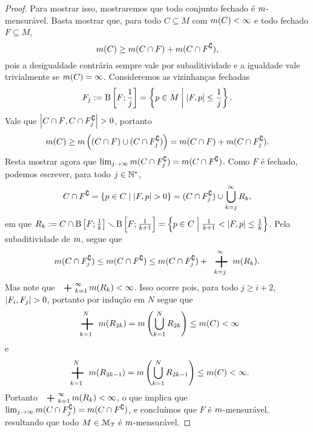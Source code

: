 \begin{proof}
Para mostrar isso, mostraremos que todo conjunto fechado é $m$-mensurável. Basta mostrar que, para todo $C \subseteq M$ com $m(C) < \infty$ e todo fechado $F \subseteq M$,
	\begin{equation*}
	m(C) \geq m(C \cap F) + m(C \cap F^\complement),
	\end{equation*}
pois a desigualdade contrária sempre vale por subaditividade e a igualdade vale trivialmente se $m(C) = \infty$. Consideremos as vizinhanças fechadas
	\begin{equation*}
	F_j := \mathrm{B}\left[{F};{\frac{1}{j}}\right] = \left\{{p \in M}\;\middle\vert\;{\left\vert{F},{p}\right\vert \leq \frac{1}{j}}\right\}.
	\end{equation*}
Vale que $\left\vert{C \cap F},{C \cap F_j^\complement}\right\vert > 0$, portanto
	\begin{equation*}
	m(C) \geq m\left( (C \cap F) \cup (C \cap F_j^\complement) \right) = m(C \cap F) + m(C \cap F_j^\complement).
	\end{equation*}
Resta mostrar agora que $\lim_{j \rightarrow \infty} m(C \cap F_j^\complement) = m(C \cap F^\complement)$. Como $F$ é fechado, podemos escrever, para todo $j \in \mathbb{N}^*$,
	\begin{equation*}
	C \cap F^\complement = \left\{{p \in C}\;\middle\vert\;{\left\vert{F},{p}\right\vert > 0}\right\} = (C \cap F_j^\complement) \cup \bigcup_{k=j}^\infty R_k,
	\end{equation*}
em que $R_k := C \cap \mathrm{B}\left[{F};{\frac{1}{k}}\right] \smallsetminus \mathrm{B}\left[{F};{\frac{1}{k+1}}\right] = \left\{{p \in C}\;\middle\vert\;{\frac{1}{k+1} < \left\vert{F},{p}\right\vert \leq \frac{1}{k}}\right\}$. Pela subaditividade de $m$, segue que
	\begin{equation*}
	\med(C \cap F_j^\complement) \leq \med(C \cap F^\complement) \leq \med(C \cap F_j^\complement) + \sum_{k=j}^\infty \med(R_k).
	\end{equation*}
Mas note que $\sum_{k=1}^\infty \med(R_k) < \infty$. Isso ocorre pois, para todo $j \geq i+2$, $\left\vert{F_i},{F_j}\right\vert > 0$, portanto por indução em $N$ segue que
	\begin{equation*}
	\sum_{k=1}^N \med(R_{2k}) = \med\left( \bigcup_{k=1}^N R_{2k} \right) \leq \med(C) < \infty
	\end{equation*}
e
	\begin{equation*}
	\sum_{k=1}^N \med(R_{2k-1}) = \med\left( \bigcup_{k=1}^N R_{2k-1} \right) \leq \med(C) < \infty.
	\end{equation*}
Portanto $\sum_{k=1}^\infty \med(R_k) < \infty$, o que implica que $\lim_{j \rightarrow \infty} m(C \cap F_j^\complement) = m(C \cap F^\complement)$, e concluímos que $F$ é $m$-mensurável, resultando que todo $M \in \mathcal{M}_{\mathcal{T}}$ é $m$-mensurável.
\end{proof}

